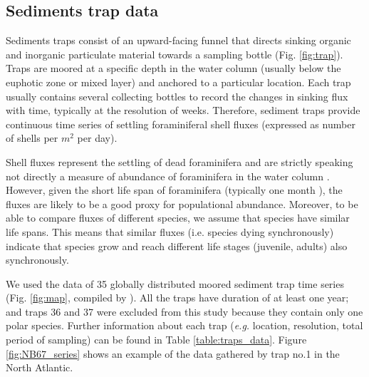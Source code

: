 



\subsection{Sediments trap data}

Sediments traps consist of an upward-facing funnel that directs sinking organic and inorganic particulate material towards a sampling bottle (Fig. \ref{fig:trap}). 
Traps are moored at a specific depth in the water column (usually below the euphotic zone or mixed layer) and anchored to a particular location. %
Each trap usually contains several collecting bottles to record the changes in sinking flux with time, typically at the resolution of weeks. %
Therefore, sediment traps provide continuous time series of settling foraminiferal shell fluxes (expressed as number of shells per $m^2$ per day). 

Shell fluxes represent the settling of dead foraminifera and are strictly speaking not directly a measure of abundance of foraminifera in the water column \cite{jonkers2015global}. However, given the short life span of foraminifera (typically one month \citep{hemleben1989modern}), the fluxes are likely to be a good proxy for populational abundance. Moreover, to be able to compare fluxes of different species, we assume that species have similar life spans. This means that similar fluxes (i.e. species dying synchronously) indicate that species grow and reach different life stages (juvenile, adults) also synchronously.


We used the data of 35 globally distributed moored sediment trap time series (Fig. \ref{fig:map}, compiled by \citealt{jonkers2015global}). All the traps have duration of at least one year; and traps 36 and 37 were excluded from this study because they contain only one polar species. Further information about each trap (\textit{e.g.} location, resolution, total period of sampling) can be found in Table \ref{table:traps_data}. Figure \ref{fig:NB67_series} shows an example of the data gathered by trap no.1 in the North Atlantic. 

